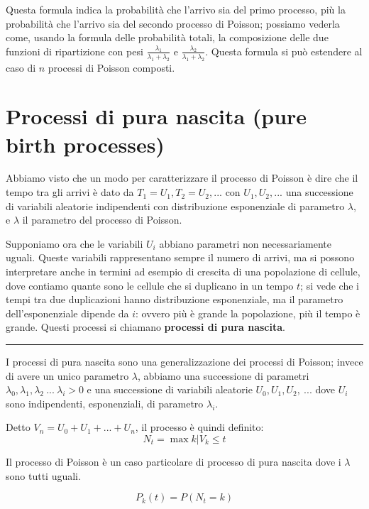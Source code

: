 \documentclass[a4paper,12pt]{book}
\begin{document}
Questa formula indica la probabilità che l'arrivo sia del primo processo, più la probabilità che l'arrivo sia del secondo processo di Poisson; possiamo vederla come, usando la formula delle probabilità totali, la composizione delle due funzioni di ripartizione  con pesi $\frac{\lambda_1}{\lambda_1 + \lambda_{2}}$ e $\frac{\lambda_{2}}{\lambda_{1} + \lambda_{2}}$. Questa formula si può estendere al caso di $ n $ processi di Poisson composti. 

\section{Processi di pura nascita (pure birth processes)}
Abbiamo visto che un modo per caratterizzare il processo di Poisson è dire che il tempo tra gli arrivi è dato da $ T_1 = U_1, T_2 = U_2, ... $ con $ U_1, U_2, ... $ una successione di variabili aleatorie indipendenti con distribuzione esponenziale di parametro $\lambda$, e $\lambda$ il parametro del processo di Poisson.

Supponiamo ora che le variabili $ U_i $ abbiano parametri non necessariamente uguali. Queste variabili rappresentano sempre il numero di arrivi, ma si possono interpretare anche in termini ad esempio di crescita di una popolazione di cellule, dove contiamo quante sono le cellule che si duplicano in un tempo $ t $; 
si vede che i tempi tra due duplicazioni hanno distribuzione esponenziale, ma il parametro dell'esponenziale dipende da $ i $: ovvero più è grande la popolazione, più il tempo è grande. Questi processi si chiamano \textbf{processi di pura nascita}. 
 
 \hspace{0.5cm}
 \hrule
 \hspace{0.5cm}
 
 I processi di pura nascita sono una generalizzazione dei processi di Poisson; invece di avere un unico parametro $\lambda$, abbiamo una successione di parametri $\lambda_0, \lambda_1, \lambda_2 \ ... \ \lambda_i > 0$ e una successione di variabili aleatorie $U_0, U_1, U_2, \ ...$ dove $ U_i $ sono indipendenti, esponenziali, di parametro $ \lambda_i $. 

Detto $ V_n = U_0 + U_1 + ... + U_n $, il processo è quindi definito:
 $$ N_t = \max{k | V_k \le t} $$
 
Il processo di Poisson è un caso particolare di processo di pura nascita dove i $ \lambda $ sono tutti uguali.  
 
 $$ P_k(t) = P(N_t = k) $$
 
\end{document}
